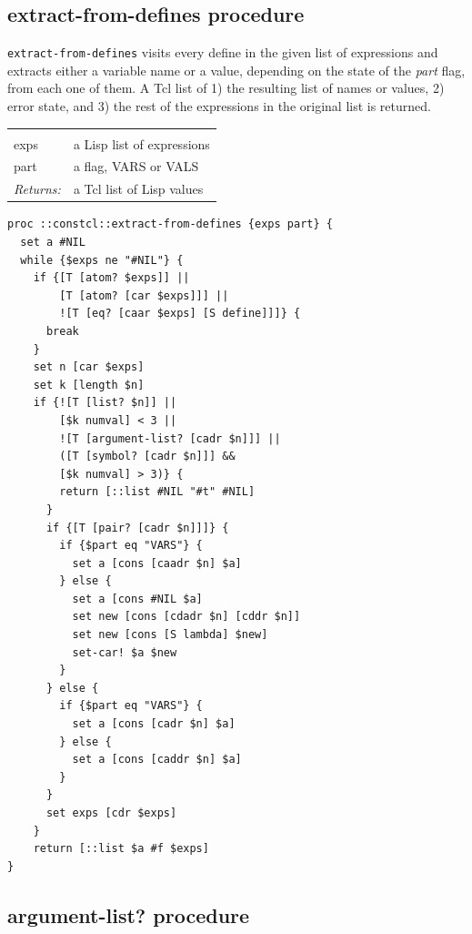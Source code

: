 \documentclass[twoside,9pt]{report}
\begin{document}
\subsection{extract-from-defines procedure}
\label{extract-from-defines-procedure}


\texttt{extract-from-defines} visits every define in the given list of expressions and extracts either a variable name or a value, depending on the state of the \emph{part} flag, from each one of them. A Tcl list of 1) the resulting list of names or values, 2) error state, and 3) the rest of the expressions in the original list is returned.

\noindent\begin{tabular}{ |p{1.9cm} p{8cm}| }
\hline
\rowcolor[HTML]{CCCCCC} \multicolumn{2}{|l|}{\bf extract-from-defines (internal)} \\
exps & a Lisp list of expressions \\
part & a flag, VARS or VALS \\
\textit{Returns:} & a Tcl list of Lisp values \\
\hline
\end{tabular}
\begin{lstlisting}
proc ::constcl::extract-from-defines {exps part} {
  set a #NIL
  while {$exps ne "#NIL"} {
    if {[T [atom? $exps]] ||
        [T [atom? [car $exps]]] ||
        ![T [eq? [caar $exps] [S define]]]} {
      break
    }
    set n [car $exps]
    set k [length $n]
    if {![T [list? $n]] ||
        [$k numval] < 3 ||
        ![T [argument-list? [cadr $n]]] ||
        ([T [symbol? [cadr $n]]] &&
        [$k numval] > 3)} {
        return [::list #NIL "#t" #NIL]
      }
      if {[T [pair? [cadr $n]]]} {
        if {$part eq "VARS"} {
          set a [cons [caadr $n] $a]
        } else {
          set a [cons #NIL $a]
          set new [cons [cdadr $n] [cddr $n]]
          set new [cons [S lambda] $new]
          set-car! $a $new
        }
      } else {
        if {$part eq "VARS"} {
          set a [cons [cadr $n] $a]
        } else {
          set a [cons [caddr $n] $a]
        }
      }
      set exps [cdr $exps]
    }
    return [::list $a #f $exps]
}
\end{lstlisting}
\subsection{argument-list? procedure}
\label{argument-list?-procedure}
\end{document}
